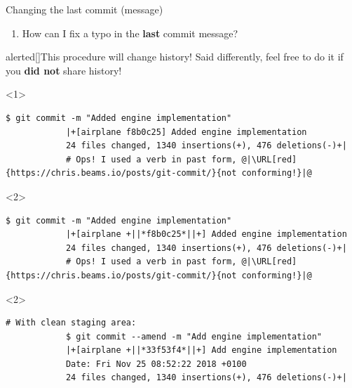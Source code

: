 \documentclass[usenames,svgnames,14pt]{beamer}
\begin{document}
\begin{frame}[fragile]{Changing the last commit (message)}
    \begin{enumerate}
        \item How can I fix a typo in the \textbf{last} commit message?
    \end{enumerate}
    \begin{varblock}{alerted}[\textwidth]{This procedure will change history!}
        Said differently, feel free to do it if you \alert{\textbf{did not}} share history!
    \end{varblock}
    \vspace{3mm}
    \begin{onlyenv}<1>
        \begin{lstlisting}[style=MyBash]
            $ git commit -m "Added engine implementation"
            |+[airplane f8b0c25] Added engine implementation
            24 files changed, 1340 insertions(+), 476 deletions(-)+|
            # Ops! I used a verb in past form, @|\URL[red]{https://chris.beams.io/posts/git-commit/}{not conforming!}|@
        \end{lstlisting}
    \end{onlyenv}
    \begin{onlyenv}<2>
        \begin{lstlisting}[style=MyBash]
            $ git commit -m "Added engine implementation"
            |+[airplane +||*f8b0c25*||+] Added engine implementation
            24 files changed, 1340 insertions(+), 476 deletions(-)+|
            # Ops! I used a verb in past form, @|\URL[red]{https://chris.beams.io/posts/git-commit/}{not conforming!}|@
        \end{lstlisting}
    \end{onlyenv}
    \begin{uncoverenv}<2>
        \begin{lstlisting}[style=MyBash]
            # With clean staging area:
            $ git commit --amend -m "Add engine implementation"
            |+[airplane +||*33f53f4*||+] Add engine implementation
            Date: Fri Nov 25 08:52:22 2018 +0100
            24 files changed, 1340 insertions(+), 476 deletions(-)+|
        \end{lstlisting}
    \end{uncoverenv}
\end{frame}
\end{document}
